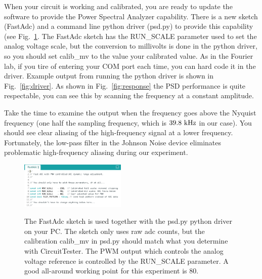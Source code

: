\documentclass[12pt]{article}
\begin{document}
When your circuit is working and calibrated, you are ready to update the software to provide the Power Spectral Analyzer capability.  There is a new sketch (FastAdc) and a command line python driver (psd.py)
to provide this capability (see Fig.~\ref{fig:fastadc}.  The FastAdc sketch has the RUN\_SCALE parameter used to set the analog voltage scale, but the conversion to millivolts is done in the python driver, so you should set calib\_mv to the value your calibrated value.  As in the Fourier lab, if you tire of entering your COM port each time, you can hard code it in the driver.   Example output from running the python driver is shown in Fig.~\ref{fig:driver}.  As shown in Fig.~\ref{fig:response} the PSD performance is quite respectable, you can see this by scanning the frequency at a constant amplitude.  

Take the time to examine the output when the frequency goes above the Nyquist frequency (one half the sampling frequency, which is $39.8~\rm kHz$ in our case).  You should see clear aliasing of the high-frequency signal at a lower frequency.  Fortunately, the low-pass filter in the Johnson Noise device eliminates problematic high-frequency aliasing during our experiment.

\begin{figure}[htbp]
\begin{center}
{\includegraphics[width=0.45\textwidth]{figs/fast_adc.png}}
\end{center}
\caption{\label{fig:fastadc}    
The FastAdc sketch is used together with the psd.py python driver on your PC.  The sketch only uses raw adc counts, but the calibration calib\_mv in psd.py should match what you determine with CircuitTester.  
The PWM output which controls the analog voltage reference is controlled by the RUN\_SCALE parameter.
A good all-around working point for this experiment is 80.
}\end{figure}
\end{document}
